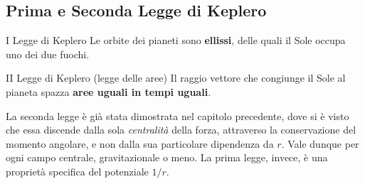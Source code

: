 \subsection{Prima e Seconda Legge di Keplero}

\begin{teorema}{I Legge di Keplero}
Le orbite dei pianeti sono \textbf{ellissi}, delle quali il Sole occupa uno dei due fuochi.
\end{teorema}

\begin{teorema}{II Legge di Keplero (legge delle aree)}
Il raggio vettore che congiunge il Sole al pianeta spazza \textbf{aree uguali in tempi uguali}.
\end{teorema}

La seconda legge è già stata dimostrata nel capitolo precedente, dove si è visto che essa discende dalla sola \emph{centralità} della forza, attraverso la conservazione del momento angolare, e non dalla sua particolare dipendenza da $r$. Vale dunque per ogni campo centrale, gravitazionale o meno. La prima legge, invece, è una proprietà specifica del potenziale $1/r$.

